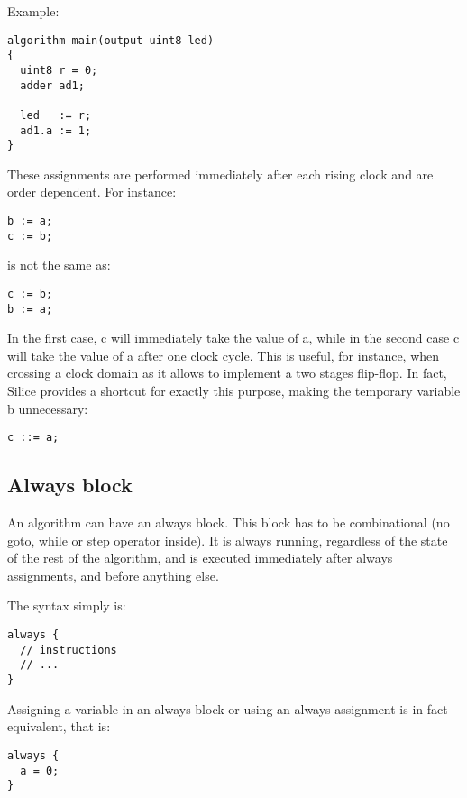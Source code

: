 \documentclass[a4]{article}
\newcommand\silice{Silice}
\begin{document}
\noindent Example:
\begin{verbatim}
algorithm main(output uint8 led)
{
  uint8 r = 0;
  adder ad1;

  led   := r;
  ad1.a := 1;
}
\end{verbatim}

\noindent These assignments are performed immediately after each rising clock and are order dependent. For instance:
\begin{verbatim}
b := a;
c := b;
\end{verbatim}
is not the same as:
\begin{verbatim}
c := b;
b := a;
\end{verbatim}
In the first case, c will immediately take the value of a, while in the second case
c will take the value of a after one clock cycle. This is useful, for instance, when
crossing a clock domain as it allows to implement a two stages flip-flop. In fact,
\silice{} provides a shortcut for exactly this purpose, making the temporary variable b unnecessary:

\begin{verbatim}
c ::= a;
\end{verbatim}


\subsection{Always block}

An algorithm can have an always block. This block has to be combinational (no goto, while or step operator inside). It is always running, regardless of the state of the rest of the algorithm, and is executed immediately after always assignments, and before anything else.

The syntax simply is:

\begin{verbatim}
always {
  // instructions
  // ...
}
\end{verbatim}

Assigning a variable in an always block or using an always assignment is in fact equivalent, that is:

\begin{verbatim}
always {
  a = 0;
}
\end{verbatim}
\end{document}
